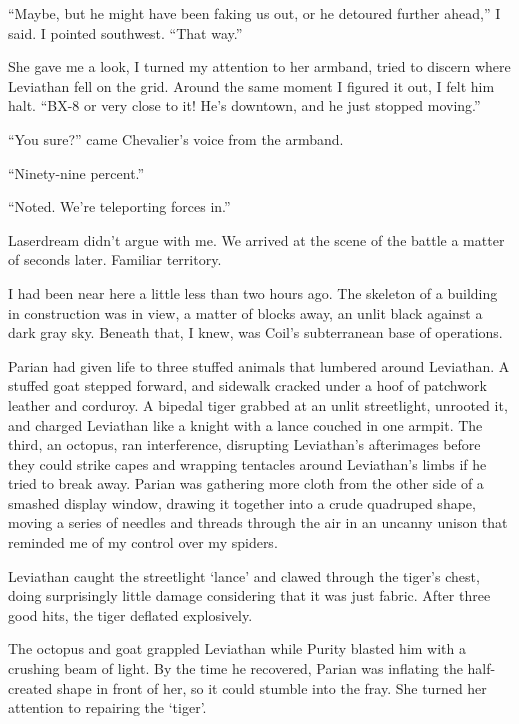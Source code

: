 ``Maybe, but he might have been faking us out, or he detoured further ahead,'' I said.  I pointed southwest.  ``That way.''



She gave me a look, I turned my attention to her armband, tried to discern where Leviathan fell on the grid.  Around the same moment I figured it out, I felt him halt.  ``BX-8 or very close to it!  He's downtown, and he just stopped moving.''



``You sure?'' came Chevalier's voice from the armband.



``Ninety-nine percent.''



``Noted.  We're teleporting forces in.''



Laserdream didn't argue with me.  We arrived at the scene of the battle a matter of seconds later.  Familiar territory.



I had been near here a little less than two hours ago.  The skeleton of a building in construction was in view, a matter of blocks away, an unlit black against a dark gray sky.  Beneath that, I knew, was Coil's subterranean base of operations.



Parian had given life to three stuffed animals that lumbered around Leviathan.  A stuffed goat stepped forward, and sidewalk cracked under a hoof of patchwork leather and corduroy.  A bipedal tiger grabbed at an unlit streetlight, unrooted it, and charged Leviathan like a knight with a lance couched in one armpit.  The third, an octopus, ran interference, disrupting Leviathan's afterimages before they could strike capes and wrapping tentacles around Leviathan's limbs if he tried to break away.  Parian was gathering more cloth from the other side of a smashed display window, drawing it together into a crude quadruped shape, moving a series of needles and threads through the air in an uncanny unison that reminded me of my control over my spiders.



Leviathan caught the streetlight `lance' and clawed through the tiger's chest, doing surprisingly little damage considering that it was just fabric.  After three good hits, the tiger deflated explosively.



The octopus and goat grappled Leviathan while Purity blasted him with a crushing beam of light.  By the time he recovered, Parian was inflating the half-created shape in front of her, so it could stumble into the fray.  She turned her attention to repairing the `tiger'.



